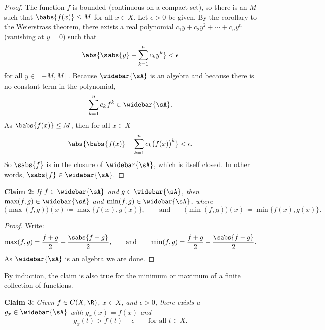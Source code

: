 \begin{proof}
The function $f$ is bounded (continuous on a compact set), so there is an $M$
such that $\babs{f(x)} \leq M$ for all $x \in X$.
Let $\epsilon > 0$ be given.  By the corollary to the Weierstrass theorem,
there exists a real polynomial $c_1 y + c_2 y^2 + \cdots+ c_n y^n$
(vanishing at $y=0$) such that
\begin{equation*}
\abs{\sabs{y} - \sum_{k=1}^n c_k y^k} < \epsilon
\end{equation*}
for all $y \in [-M,M]$.
Because $\widebar{\sA}$ is an algebra and because there is no constant term in the
polynomial,
\begin{equation*}
\sum_{k=1}^n c_k f^k \in \widebar{\sA} .
\end{equation*}
As $\babs{f(x)} \leq M$, then  for all $x \in X$
\begin{equation*}
\abs{\babs{f(x)} - \sum_{k=1}^n c_k {\bigl(f(x)\bigr)}^k}
< \epsilon .
\end{equation*}
So $\sabs{f}$ is in the closure of $\widebar{\sA}$, which is itself closed.
In other words, $\sabs{f} \in \widebar{\sA}$.
\end{proof}

\medskip

\noindent
\textbf{Claim 2:} \emph{If $f \in \widebar{\sA}$ and $g \in \widebar{\sA}$, then
$\max(f,g) \in \widebar{\sA}$ and
$\min(f,g) \in \widebar{\sA}$, where
}
\begin{equation*}
\bigl(\max(f,g)\bigr) (x) \coloneqq \max \bigl\{ f(x), g(x) \bigr\} , \qquad
\text{and} \qquad
\bigl(\min(f,g)\bigr) (x) \coloneqq \min \bigl\{ f(x), g(x) \bigr\} .
\end{equation*}

\begin{proof}
Write:
\begin{equation*}
\max(f,g) = \frac{f+g}{2} + \frac{\sabs{f-g}}{2} ,
\qquad\text{and}\qquad
\min(f,g) = \frac{f+g}{2} - \frac{\sabs{f-g}}{2} .
\end{equation*}
As $\widebar{\sA}$ is an algebra we are done.
\end{proof}

By induction, the claim is also true for the minimum or maximum of a finite
collection of functions.

\medskip

\noindent
\textbf{Claim 3:} \emph{Given $f \in C(X,\R)$, $x \in X$, and $\epsilon > 0$,
there exists a $g_x \in \widebar{\sA}$ with $g_x(x) = f(x)$ and
}
\begin{equation*}
g_x(t) > f(t)-\epsilon \qquad \text{for all } t \in X.
\end{equation*}

